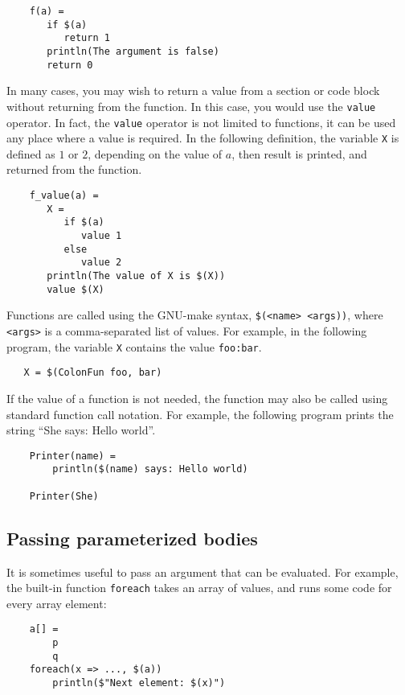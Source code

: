 \begin{verbatim}
    f(a) =
       if $(a)
          return 1
       println(The argument is false)
       return 0
\end{verbatim}

%
In many cases, you may wish to return a value from a section or code block without returning from
the function.  In this case, you would use the \verb+value+ operator.  In fact, the \verb+value+
operator is not limited to functions, it can be used any place where a value is required.  In the
following definition, the variable \verb+X+ is defined as $1$ or $2$, depending on the value of $a$,
then result is printed, and returned from the function.

\begin{verbatim}
    f_value(a) =
       X =
          if $(a)
             value 1
          else
             value 2
       println(The value of X is $(X))
       value $(X)
\end{verbatim}

Functions are called using the GNU-make syntax, \verb+$(<name> <args))+,
where \verb+<args>+ is a comma-separated list of values.  For example,
in the following program, the variable \verb+X+ contains the
value \verb+foo:bar+.

\begin{verbatim}
   X = $(ColonFun foo, bar)
\end{verbatim}

If the value of a function is not needed, the function may also be called
using standard function call notation.  For example, the following program
prints the string ``She says: Hello world''.

\begin{verbatim}
    Printer(name) =
        println($(name) says: Hello world)

    Printer(She)
\end{verbatim}

\subsection{Passing parameterized bodies}
\label{section:param-bodies}

It is sometimes useful to pass an argument that can be evaluated. For example,
the built-in function \verb+foreach+ takes an array of values, and runs some
code for every array element:

\begin{verbatim}
    a[] =
        p
        q
    foreach(x => ..., $(a))
        println($"Next element: $(x)")
\end{verbatim}


